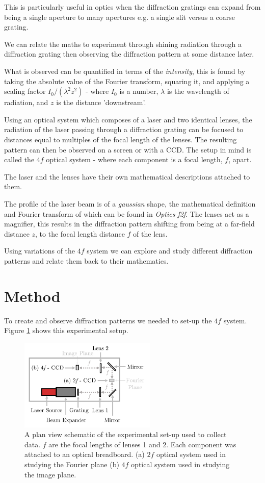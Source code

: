 \documentclass[twocolumn]{revtex4}
\begin{document}
This is particularly useful in optics when the diffraction gratings can expand from being a single aperture to many apertures e.g. a single slit versus a coarse grating.

We can relate the maths to experiment through shining radiation through a diffraction grating then observing the diffraction pattern at some distance later. 

What is observed can be quantified in terms of the \textit{intensity}, this is found by taking the absolute value of the Fourier transform, squaring it, and applying a scaling factor $I_0/(\lambda^2z^2)$ - where $I_0$ is a number, $\lambda$ is the wavelength of radiation, and $z$ is the distance 'downstream'.

Using an optical system which composes of a laser and two identical lenses, the radiation of the laser passing through a diffraction grating can be focused to distances equal to multiples of the focal length of the lenses. The resulting pattern can then be observed on a screen or with a CCD. The setup in mind is called the $4f$ optical system - where each component is a focal length, $f$, apart.

The laser and the lenses have their own mathematical descriptions attached to them.

The profile of the laser beam is of a \textit{gaussian} shape, the mathematical definition and Fourier transform of which can be found in \textit{Optics f2f}. The lenses act as a magnifier, this results in the diffraction pattern shifting from being at a far-field distance $z$, to the focal length distance $f$ of the lens.

Using variations of the $4f$ system we can explore and study different diffraction patterns and relate them back to their mathematics.

\vspace{-3ex}
\section{Method} 
\vspace{-2ex}
To create and observe diffraction patterns we needed to set-up the $4f$ system. Figure \ref{m-fig1} shows this experimental setup.
\begin{figure}[!h]
\begin{center}
\includegraphics[width=6.5cm]{method/fig1-1}
\caption[]{A plan view schematic of the experimental set-up used to collect data. $f$ are the focal lengths of lenses 1 and 2. Each component was attached to an optical breadboard. (a) $2f$ optical system used in studying the Fourier plane (b) $4f$ optical system used in studying the image plane.}
\label{m-fig1}
\end{center}
\end{figure}
\end{document}
